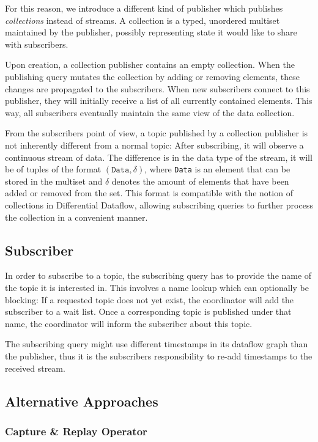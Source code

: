 For this reason, we introduce a different kind of publisher which publishes
\emph{collections} instead of streams. A collection is a typed, unordered
multiset maintained by the publisher, possibly representing state it would
like to share with subscribers.

Upon creation, a collection publisher contains an empty collection.
When the publishing query mutates the collection by adding or removing elements,
these changes are propagated to the subscribers. When new subscribers connect
to this publisher, they will initially receive a list of all currently contained
elements. This way, all subscribers eventually maintain the same view of the
data collection.

From the subscribers point of view, a topic published by a collection publisher
is not inherently different from a normal topic: After subscribing, it will
observe a continuous stream of data. The difference is in the data type of the
stream, it will be of tuples of the format $(\texttt{Data}, \delta)$, where
\texttt{Data} is an element that can be stored in the multiset and $\delta$ 
denotes the amount of elements that have been added or removed from the set.
This format
is compatible with the notion of collections in Differential Dataflow, allowing
subscribing queries to further process the collection in a convenient manner.

\subsection{Subscriber}

In order to subscribe to a topic, the subscribing query has to provide the name
of the topic it is interested in. This involves a name lookup which can optionally
be blocking: If a requested topic does not yet exist, the coordinator will add
the subscriber to a wait list. Once a corresponding topic is published under that
name, the coordinator will inform the subscriber about this topic. 

The subscribing query might use different timestamps in its dataflow graph
than the publisher, thus it is the subscribers responsibility to re-add
timestamps to the received stream. 

\subsection{Alternative Approaches}

\subsubsection{Capture \& Replay Operator}

